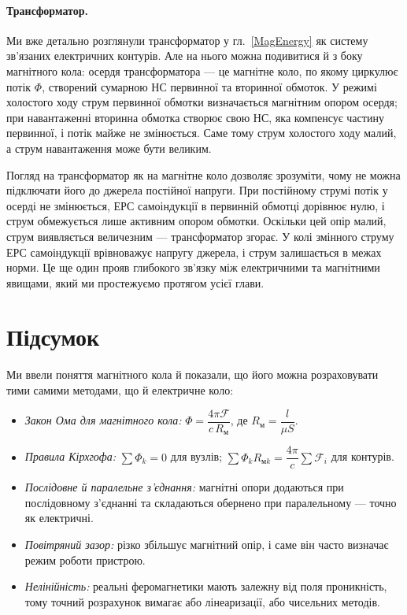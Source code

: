\documentclass[]{ConspectBook}
\begin{document}
\paragraph*{Трансформатор.} Ми вже детально розглянули трансформатор у гл.~\ref{MagEnergy} як систему зв'язаних електричних контурів. Але на нього можна подивитися й з боку магнітного кола: осердя трансформатора --- це магнітне коло, по якому циркулює потік $\Phi$, створений сумарною НС первинної та вторинної обмоток. У режимі холостого ходу струм первинної обмотки визначається магнітним опором осердя; при навантаженні вторинна обмотка створює свою НС, яка компенсує частину первинної, і потік майже не змінюється. Саме тому струм холостого ходу малий, а струм навантаження може бути великим.

\begin{Attention}
	Погляд на трансформатор як на магнітне коло дозволяє зрозуміти, чому не можна підключати його до джерела постійної напруги. При постійному струмі потік у осерді не змінюється, ЕРС самоіндукції в первинній обмотці дорівнює нулю, і струм обмежується лише активним опором обмотки. Оскільки цей опір малий, струм виявляється величезним --- трансформатор згорає. У колі змінного струму ЕРС самоіндукції врівноважує напругу джерела, і струм залишається в межах норми. Це ще один прояв глибокого зв'язку між електричними та магнітними явищами, який ми простежуємо протягом усієї глави.
\end{Attention}

\section{Підсумок}

Ми ввели поняття магнітного кола й показали, що його можна розраховувати тими самими методами, що й електричне коло:

\begin{itemize}
	\item \emph{Закон Ома для магнітного кола:} $\Phi = \dfrac{4\pi\mathcal{F}}{c\,R_{\text{м}}}$, де $R_{\text{м}} = \dfrac{l}{\mu S}$.
	\item \emph{Правила Кірхгофа:} $\sum \Phi_k = 0$ для вузлів; $\sum \Phi_k R_{\text{м}k} = \dfrac{4\pi}{c}\sum \mathcal{F}_i$ для контурів.
	\item \emph{Послідовне й паралельне з'єднання:} магнітні опори додаються при послідовному з'єднанні та складаються обернено при паралельному --- точно як електричні.
	\item \emph{Повітряний зазор:} різко збільшує магнітний опір, і саме він часто визначає режим роботи пристрою.
	\item \emph{Нелінійність:} реальні феромагнетики мають залежну від поля проникність, тому точний розрахунок вимагає або лінеаризації, або чисельних методів.
\end{itemize}
\end{document}
